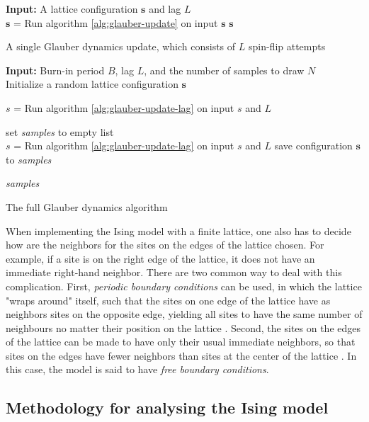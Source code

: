 \documentclass[12pt]{article}
\begin{document}
\begin{algorithm}
\textbf{Input:} A lattice configuration $\boldsymbol{s}$ and lag $L$ \\
 {
	$\boldsymbol{s}$ = Run algorithm \ref{alg:glauber-update} on input $\boldsymbol{s}$\;
}
\Return $\boldsymbol{s}$\;
\caption{A single Glauber dynamics update, which consists of $L$ spin-flip attempts}
\label{alg:glauber-update-lag}
\end{algorithm}

\begin{algorithm}
\textbf{Input:} Burn-in period $B$, lag $L$, and the number of samples to draw $N$ \\ 
Initialize a random lattice configuration $\boldsymbol{s}$\;

 {  
	$s$ = Run algorithm \ref{alg:glauber-update-lag} on input $s$ and $L$\;
}

set \textit{samples} to empty list  \\
 {
	$s$ = Run algorithm \ref{alg:glauber-update-lag} on input $s$ and $L$\;
	save configuration $\boldsymbol{s}$ to \textit{samples}\;
}

\Return \textit{samples}
\caption{The full Glauber dynamics algorithm}
\label{alg:glauber-full}
\end{algorithm}

When implementing the Ising model with a finite lattice, one also has to decide how are the neighbors for the sites on the edges of the lattice chosen. For example, if a site is on the right edge of the lattice, it does not have an immediate right-hand neighbor. There are two common way to deal with this complication. First, \textit{periodic boundary conditions} can be used, in which the lattice "wraps around" itself, such that the sites on one edge of the lattice have as neighbors sites on the opposite edge, yielding all sites to have the same number of neighbours no matter their position on the lattice \cite{spin-models-thesis}. Second, the sites on the edges of the lattice can be made to have only their usual immediate neighbors, so that sites on the edges have fewer neighbors than sites at the center of the lattice \cite{spin-models-thesis}. In this case, the model is said to have \textit{free boundary conditions}.

\subsection{Methodology for analysing the Ising model}
\end{document}
